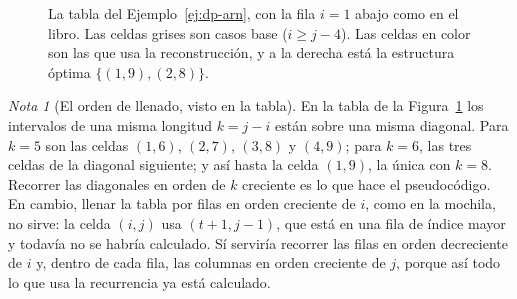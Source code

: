 \documentclass[12pt, spanish, oneside, openany]{book}
\theoremstyle{uprightplain}
\theoremstyle{definition}
\theoremstyle{remark}
\newtheorem{nota}[teorema]{Nota}
\theoremstyle{definition}
\newcommand{\base}[2]{(#1)_{#2}}
\newcommand{\val}{\operatorname{val}}   %
\begin{document}
\begin{figure}[H]
\centering
{}
\caption{La tabla del Ejemplo~\ref{ej:dp-arn}, con la fila $i=1$ abajo como en
el libro. Las celdas grises son casos base ($i\ge j-4$). Las celdas en color
son las que usa la reconstrucción, y a la derecha está la estructura óptima
$\{(1,9),(2,8)\}$.}
\label{fig:dp-arn-tabla}
\end{figure}

\begin{nota}[El orden de llenado, visto en la tabla]
\label{nota:dp-arn-orden}
En la tabla de la Figura~\ref{fig:dp-arn-tabla} los intervalos de una misma longitud $k=j-i$ están sobre una misma diagonal. Para $k=5$ son las celdas $(1,6)$, $(2,7)$, $(3,8)$ y $(4,9)$; para $k=6$, las tres celdas de la diagonal siguiente; y así hasta la celda $(1,9)$, la única con $k=8$. Recorrer las diagonales en orden de $k$ creciente es lo que hace el pseudocódigo. En cambio, llenar la tabla por filas en orden creciente de $i$, como en la mochila, no sirve: la celda $(i,j)$ usa $(t+1,j-1)$, que está en una fila de índice mayor y todavía no se habría calculado. Sí serviría recorrer las filas en orden decreciente de $i$ y, dentro de cada fila, las columnas en orden creciente de $j$, porque así todo lo que usa la recurrencia ya está calculado.
\end{nota}
\end{document}
